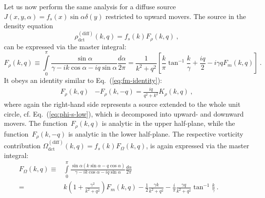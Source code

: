 \documentclass[preprint,aps,eqsecnum, prb]{revtex4-1}
\newcommand{\fplus}[1]{{#1}^{+}}
\newcommand{\sgn}{\mathop{\mathrm{sgn}}\nolimits}
\newcommand{\dct}[1]{{#1}_\mathrm{dct}}
\begin{document}

Let us now perform the same analysis for a diffuse source
$J(x, y, \alpha) = f_s(x) \sin\alpha \delta(y)$ restricted to
upward movers. The source in the density equation
\begin{equation}
  \label{eq:source-diff-rho}
  \dct{\rho}^\mathrm{(diff)}(k, q) = f_{s}(k) F_\rho(k, q)
  \ ,
\end{equation}
can be expressed via the master integral:
\begin{equation}
  \label{eq:source-frho-def}
  F_\rho(k, q) \equiv
  \int\limits_{0}^{\pi} \frac{\sin\alpha}{\gamma -
    i k \cos\alpha - i q \sin\alpha}
             \frac{d\alpha}{2\pi}
  =  \frac{1}{k^2 + q^2} \left[ \frac{k}{\pi} \tan^{-1}\frac{k}{\gamma}
                              + \frac{iq}{2}
  - i \gamma q F_m(k, q) \right]
  \ .
\end{equation}
It obeys an identity similar to Eq.~(\ref{eq:fm-identity}):
\begin{align}
\label{eq:frho-identity}
F_\rho(k, q) &-  F_\rho(k, -q) = \frac{i q}{q^2 + k^2} K_\rho(k, q)
\ ,
\end{align}
where again the right-hand side represents a source extended to
the whole unit circle, cf. Eq.~(\ref{eq:phi-s-low}),
which is decomposed into upward- and downward
movers. The function~$F_\rho(k, q)$ is analytic in the upper half-plane,
while the function~$F_\rho(k, -q)$ is analytic in the lower half-plane.
The respective vorticity contribution
$ \dct{\Omega}^\mathrm{(diff)}(k, q) = f_{s}(k) F_\Omega (k, q) $,
is again expressed via the master integral:
\begin{align}
\label{eq:source-diff-omega}
  F_\Omega(k, q) \equiv{}&  \int\limits_{0}^{\pi}
              \frac{\sin\alpha (k \sin \alpha - q \cos\alpha)}{\gamma
                - i k \cos\alpha - i q \sin\alpha} \frac{d\alpha}{2\pi} && &
  \\
  ={}& k \left(1 + \frac{\gamma^2}{k^2 + q^2}\right) F_m(k, q)
                 -\frac{1}{2} \frac{\gamma k}{k^2 + q^2}
  - \frac{i}{\pi} \frac{\gamma q}{k^2 + q^2} \tan^{-1}\frac{k}{\gamma}
  \ .
  \nonumber
\end{align}
\end{document}
